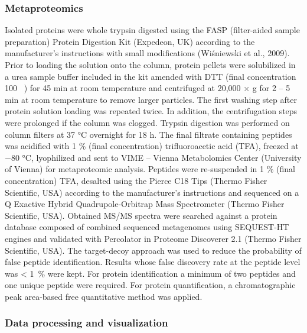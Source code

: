 \documentclass[12pt,]{article}
\begin{document}
\hypertarget{metaproteomics}{%
\subsubsection{Metaproteomics}\label{metaproteomics}}

Isolated proteins were whole trypsin digested using the FASP
(filter-aided sample preparation) Protein Digestion Kit (Expedeon, UK)
according to the manufacturer's instructions with small modifications
(Wiśniewski et al., 2009). Prior to loading the solution onto the
column, protein pellets were solubilized in a urea sample buffer
included in the kit amended with DTT (final concentration 100
\si{\milli\Molar}) for 45 \si{\minute} at room temperature and
centrifuged at 20,000 × g for 2 -- 5 \si{\minute} at room temperature to
remove larger particles. The first washing step after protein solution
loading was repeated twice. In addition, the centrifugation steps were
prolonged if the column was clogged. Trypsin digestion was performed on
column filters at 37 \si{\degreeCelsius} overnight for 18 \si{\hour}.
The final filtrate containing peptides was acidified with 1
\si{\percent} (final concentration) trifluoroacetic acid (TFA), freezed
at \num{-80} \si{\degreeCelsius}, lyophilized and sent to VIME -- Vienna
Metabolomics Center (University of Vienna) for metaproteomic analysis.
Peptides were re-suspended in 1 \si{\percent} (final concentration) TFA,
desalted using the Pierce C18 Tips (Thermo Fisher Scientific, USA)
according to the manufacturer's instructions and sequenced on a Q
Exactive Hybrid Quadrupole-Orbitrap Mass Spectrometer (Thermo Fisher
Scientific, USA). Obtained MS/MS spectra were searched against a protein
database composed of combined sequenced metagenomes using SEQUEST-HT
engines and validated with Percolator in Proteome Discoverer 2.1 (Thermo
Fisher Scientific, USA). The target-decoy approach was used to reduce
the probability of false peptide identification. Results whose false
discovery rate at the peptide level was \textless{} \SI{1}{\percent}
were kept. For protein identification a minimum of two peptides and one
unique peptide were required. For protein quantification, a
chromatographic peak area-based free quantitative method was applied.

\hypertarget{data-processing-and-visualization}{%
\subsubsection{Data processing and
visualization}\label{data-processing-and-visualization}}
\end{document}
